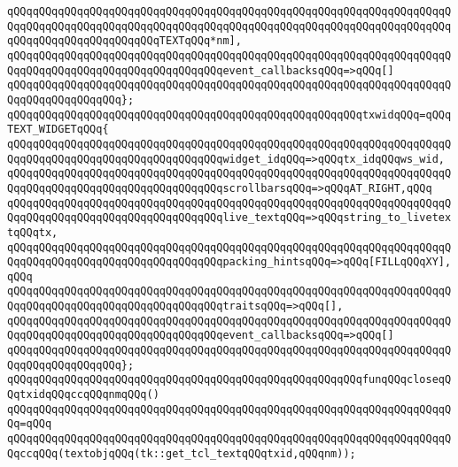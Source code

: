 \verb|qQQqqQQqqQQqqQQqqQQqqQQqqQQqqQQqqQQqqQQqqQQqqQQqqQQqqQQqqQQqqQQqqQQqqQQqqQQqqQQqqQQqqQQqqQQqqQQqqQQqqQQqqQQqqQQqqQQqqQQqqQQqqQQqqQQqqQQqqQQqqQQqqQQqqQQqqQQqqQQqqQQqTEXTqQQq*nm],|\newline
\verb|qQQqqQQqqQQqqQQqqQQqqQQqqQQqqQQqqQQqqQQqqQQqqQQqqQQqqQQqqQQqqQQqqQQqqQQqqQQqqQQqqQQqqQQqqQQqqQQqqQQqqQQqevent_callbacksqQQq=>qQQq[]|\newline
\verb|qQQqqQQqqQQqqQQqqQQqqQQqqQQqqQQqqQQqqQQqqQQqqQQqqQQqqQQqqQQqqQQqqQQqqQQqqQQqqQQqqQQqqQQq};|\newline
\newline
\verb|qQQqqQQqqQQqqQQqqQQqqQQqqQQqqQQqqQQqqQQqqQQqqQQqqQQqqQQqtxwidqQQq=qQQqTEXT_WIDGETqQQq{|\newline
\verb|qQQqqQQqqQQqqQQqqQQqqQQqqQQqqQQqqQQqqQQqqQQqqQQqqQQqqQQqqQQqqQQqqQQqqQQqqQQqqQQqqQQqqQQqqQQqqQQqqQQqqQQqwidget_idqQQq=>qQQqtx_idqQQqws_wid,|\newline
\verb|qQQqqQQqqQQqqQQqqQQqqQQqqQQqqQQqqQQqqQQqqQQqqQQqqQQqqQQqqQQqqQQqqQQqqQQqqQQqqQQqqQQqqQQqqQQqqQQqqQQqqQQqscrollbarsqQQq=>qQQqAT_RIGHT,qQQq|\newline
\verb|qQQqqQQqqQQqqQQqqQQqqQQqqQQqqQQqqQQqqQQqqQQqqQQqqQQqqQQqqQQqqQQqqQQqqQQqqQQqqQQqqQQqqQQqqQQqqQQqqQQqqQQqlive_textqQQq=>qQQqstring_to_livetextqQQqtx,|\newline
\verb|qQQqqQQqqQQqqQQqqQQqqQQqqQQqqQQqqQQqqQQqqQQqqQQqqQQqqQQqqQQqqQQqqQQqqQQqqQQqqQQqqQQqqQQqqQQqqQQqqQQqqQQqpacking_hintsqQQq=>qQQq[FILLqQQqXY],qQQq|\newline
\verb|qQQqqQQqqQQqqQQqqQQqqQQqqQQqqQQqqQQqqQQqqQQqqQQqqQQqqQQqqQQqqQQqqQQqqQQqqQQqqQQqqQQqqQQqqQQqqQQqqQQqqQQqtraitsqQQq=>qQQq[],|\newline
\verb|qQQqqQQqqQQqqQQqqQQqqQQqqQQqqQQqqQQqqQQqqQQqqQQqqQQqqQQqqQQqqQQqqQQqqQQqqQQqqQQqqQQqqQQqqQQqqQQqqQQqqQQqevent_callbacksqQQq=>qQQq[]|\newline
\verb|qQQqqQQqqQQqqQQqqQQqqQQqqQQqqQQqqQQqqQQqqQQqqQQqqQQqqQQqqQQqqQQqqQQqqQQqqQQqqQQqqQQqqQQq};|\newline
\newline
\verb|qQQqqQQqqQQqqQQqqQQqqQQqqQQqqQQqqQQqqQQqqQQqqQQqqQQqqQQqfunqQQqcloseqQQqtxidqQQqccqQQqnmqQQq()|\newline
\verb|qQQqqQQqqQQqqQQqqQQqqQQqqQQqqQQqqQQqqQQqqQQqqQQqqQQqqQQqqQQqqQQqqQQqqQQq=qQQq|\newline
\verb|qQQqqQQqqQQqqQQqqQQqqQQqqQQqqQQqqQQqqQQqqQQqqQQqqQQqqQQqqQQqqQQqqQQqqQQqccqQQq(textobjqQQq(tk::get_tcl_textqQQqtxid,qQQqnm));|\newline
\newline
